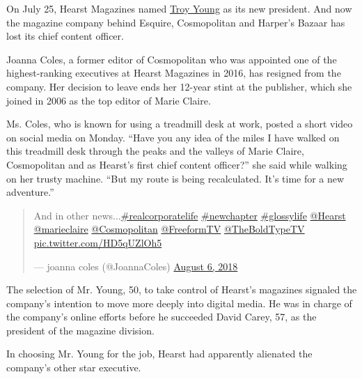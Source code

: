 On July 25, Hearst Magazines named
\href{https://www.nytimes3xbfgragh.onion/2020/07/22/business/media/hearst-harassment-troy-young.html}{Troy
Young} as its new president. And now the magazine company behind
Esquire, Cosmopolitan and Harper's Bazaar has lost its chief content
officer.

Joanna Coles, a former editor of Cosmopolitan who was appointed one of
the highest-ranking executives at Hearst Magazines in 2016, has resigned
from the company. Her decision to leave ends her 12-year stint at the
publisher, which she joined in 2006 as the top editor of Marie Claire.

Ms. Coles, who is known for using a treadmill desk at work, posted a
short video on social media on Monday. ``Have you any idea of the miles
I have walked on this treadmill desk through the peaks and the valleys
of Marie Claire, Cosmopolitan and as Hearst's first chief content
officer?'' she said while walking on her trusty machine. ``But my route
is being recalculated. It's time for a new adventure.''

\begin{quote}
And in other
news...\href{https://twitter.com/hashtag/realcorporatelife?src=hash\&ref_src=twsrc\%5Etfw}{\#realcorporatelife}
\href{https://twitter.com/hashtag/newchapter?src=hash\&ref_src=twsrc\%5Etfw}{\#newchapter}
\href{https://twitter.com/hashtag/glossylife?src=hash\&ref_src=twsrc\%5Etfw}{\#glossylife}
\href{https://twitter.com/Hearst?ref_src=twsrc\%5Etfw}{@Hearst}
\href{https://twitter.com/marieclaire?ref_src=twsrc\%5Etfw}{@marieclaire}
\href{https://twitter.com/Cosmopolitan?ref_src=twsrc\%5Etfw}{@Cosmopolitan}
\href{https://twitter.com/FreeformTV?ref_src=twsrc\%5Etfw}{@FreeformTV}
\href{https://twitter.com/TheBoldTypeTV?ref_src=twsrc\%5Etfw}{@TheBoldTypeTV}
\href{https://t.co/HD5qUZlOh5}{pic.twitter.com/HD5qUZlOh5}

--- joanna coles (@JoannaColes)
\href{https://twitter.com/JoannaColes/status/1026553562640175104?ref_src=twsrc\%5Etfw}{August
6, 2018}
\end{quote}

The selection of Mr. Young, 50, to take control of Hearst's magazines
signaled the company's intention to move more deeply into digital media.
He was in charge of the company's online efforts before he succeeded
David Carey, 57, as the president of the magazine division.

In choosing Mr. Young for the job, Hearst had apparently alienated the
company's other star executive.

